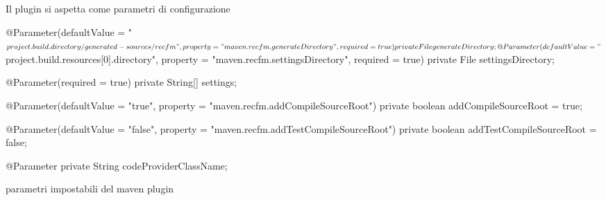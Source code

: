 \documentclass[a4paper,10pt]{report}
\newif\ifesource
\newenvironment{elisting}[1][H]
  {\captionsetup{aboveskip=0pt}\begin{listing}[#1]}
  {\end{listing}%
}
\begin{document}
Il plugin si aspetta come parametri di configurazione
\ifesource
\begin{figure*}[!htb]
\begin{lstlisting}[language=java, caption=parametri impostabili del maven plugin, 
label=lst:maven.conf]
    @Parameter(defaultValue = "${project.build.directory}/generated-sources/recfm",
        property = "maven.recfm.generateDirectory", required = true)
    private File generateDirectory;

    @Parameter(defaultValue = "${project.build.resources[0].directory}",
        property = "maven.recfm.settingsDirectory", required = true)
    private File settingsDirectory;
    
    @Parameter(required = true)
    private String[] settings;

    @Parameter(defaultValue = "true", property = "maven.recfm.addCompileSourceRoot")
    private boolean addCompileSourceRoot = true;

    @Parameter(defaultValue = "false", property = "maven.recfm.addTestCompileSourceRoot")
    private boolean addTestCompileSourceRoot = false;
    
    @Parameter
    private String codeProviderClassName;
\end{lstlisting}
\end{figure*}
\else
\begin{elisting}[!htb]
\begin{javacode}
    @Parameter(defaultValue = "${project.build.directory}/generated-sources/recfm",
        property = "maven.recfm.generateDirectory", required = true)
    private File generateDirectory;

    @Parameter(defaultValue = "${project.build.resources[0].directory}",
        property = "maven.recfm.settingsDirectory", required = true)
    private File settingsDirectory;
    
    @Parameter(required = true)
    private String[] settings;

    @Parameter(defaultValue = "true", property = "maven.recfm.addCompileSourceRoot")
    private boolean addCompileSourceRoot = true;

    @Parameter(defaultValue = "false", property = "maven.recfm.addTestCompileSourceRoot")
    private boolean addTestCompileSourceRoot = false;
    
    @Parameter
    private String codeProviderClassName;
\end{javacode}
\caption{parametri impostabili del maven plugin}
\label{lst:maven.conf}
\end{elisting}
\fi
\end{document}
